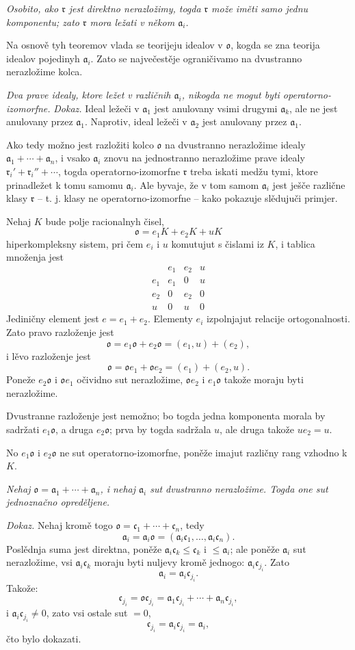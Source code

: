\documentclass[11pt]{article}
\providecommand{\ma}{\mathfrak{a}}
\providecommand{\mc}{\mathfrak{c}}
\providecommand{\mo}{\mathfrak{o}}
\providecommand{\mr}{\mathfrak{r}}
\begin{document}
\emph{Osobito, ako $\mr$ jest direktno nerazložimy, togda $\mr$ može iměti samo jednu komponentu; zato $\mr$ mora ležati v někom $\ma_i$.}

Na osnově tyh teoremov vlada se teorijeju idealov v $\mo$, kogda se zna teorija idealov pojedinyh $\ma_i$. Zato se največestěje ograničivamo na dvustranno nerazložime kolca.

\emph{Dva prave idealy, ktore ležet v različnih $\ma_i$, nikogda ne mogut byti operatorno-izomorfne.}
\emph{Dokaz.} Ideal ležeči v $\ma_1$ jest anulovany vsimi drugymi $\ma_k$, ale ne jest anulovany przez $\ma_1$. Naprotiv, ideal ležeči v $\ma_2$ jest anulovany przez $\ma_1$.

Ako tedy možno jest razložiti kolco $\mo$ na dvustranno nerazložime idealy $\ma_1+\cdots+\ma_n$, i vsako $\ma_i$ znovu na jednostranno nerazložime prave idealy $\mr_i'+\mr_i''+\cdots$, togda operatorno-izomorfne $\mr$ treba iskati medžu tymi, ktore prinadležet k tomu samomu $\ma_i$. Ale byvaje, že v tom samom $\ma_i$ jest ješče različne klasy $\mr$ -- t. j. klasy ne operatorno-izomorfne -- kako pokazuje slědujuči primjer.

Nehaj $K$ bude polje racionalnyh čisel,
\[
        \mo=e_1K+e_2K+uK
\]
hiperkompleksny sistem, pri čem $e_i$ i $u$ komutujut s čislami iz $K$, i tablica množenja jest
\[
\begin{array}{c|ccc}
     & e_1&e_2&u\\ \hline
 e_1 & e_1&0&u\\
 e_2 & 0&e_2&0\\
 u   & 0&u&0
\end{array}
\]
Jediničny element jest $e=e_1+e_2$. Elementy $e_i$ izpolnjajut relacije ortogonalnosti. Zato pravo razloženje jest
\[
        \mo=e_1\mo+e_2\mo=(e_1,u)+(e_2),
\]
i lěvo razloženje jest
\[
        \mo=\mo e_1+\mo e_2=(e_1)+(e_2,u).
\]
Poneže $e_2\mo$ i $\mo e_1$ očividno sut nerazložime, $\mo e_2$ i $e_1\mo$ takože moraju byti nerazložime.

Dvustranne razloženje jest nemožno; bo togda jedna komponenta morala by sadržati $e_1\mo$, a druga $e_2\mo$; prva by togda sadržala $u$, ale druga takože $ue_2=u$.

No $e_1\mo$ i $e_2\mo$ ne sut operatorno-izomorfne, poněže imajut različny rang vzhodno k $K$.

\emph{Nehaj $\mo=\ma_1+\cdots+\ma_n$, i nehaj $\ma_i$ sut dvustranno nerazložime. Togda one sut jednoznačno opreděljene.}

\emph{Dokaz.} Nehaj kromě togo $\mo=\mc_1+\cdots+\mc_n$, tedy
\[
        \ma_i=\ma_i\mo=(\ma_i\mc_1,\ldots,\ma_i\mc_n).
\]
Poslědnja suma jest direktna, poněže $\ma_i\mc_k\leq\mc_k$ i $\leq\ma_i$; ale poněže $\ma_i$ sut nerazložime, vsi $\ma_i\mc_k$ moraju byti nuljevy kromě jednogo: $\ma_i\mc_{j_i}$. Zato
\[
        \ma_i=\ma_i\mc_{j_i}.
\]
Takože:
\[
        \mc_{j_i}=\mo\mc_{j_i}=\ma_1\mc_{j_i}+\cdots+\ma_n\mc_{j_i},
\]
i $\ma_i\mc_{j_i}\ne0$, zato vsi ostale sut $=0$,
\[
        \mc_{j_i}=\ma_i\mc_{j_i}=\ma_i,
\]
čto bylo dokazati.
\end{document}
